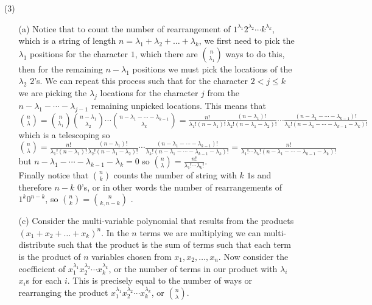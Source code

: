 \documentclass[12pt]{amsart}
\theoremstyle{definition}
\begin{document}
\begin{itemize}
\item[(3)]
\begin{itemize}
    \item[(a)] %
    Notice that to count the number of rearrangement of $1^{\lambda_{1}}2^{\lambda_{2}}\cdots k^{\lambda_{k}}$, which is a string of length $n=\lambda_1+\lambda_2+\dots+\lambda_k$, we first need to pick the $\lambda_1$ positions for the character $1$, which there are ${n\choose\lambda_1}$ ways to do this, then for the remaining $n-\lambda_1$ positions we must pick the locations of the $\lambda_2$ $2$'s. 
    We can repeat this process such that for the character $2<j\leq k$ we are picking the $\lambda_j$ locations for the character $j$ from the $n-\lambda_1-\cdots-\lambda_{j-1}$ remaining unpicked locations. 
    This means that ${n\choose\lambda}={n\choose\lambda_1}{n-\lambda_1\choose\lambda_2}\cdots{n-\lambda_1-\cdots-\lambda_{k-1}\choose\lambda_k}=\frac{n!}{\lambda_1!(n-\lambda_1)!}\frac{(n-\lambda_1)!}{\lambda_2!(n-\lambda_1-\lambda_2)!}\cdots\frac{(n-\lambda_1-\cdots-\lambda_{k-1})!}{\lambda_k!(n-\lambda_1-\cdots-\lambda_{k-1}-\lambda_k)!}$ which is a telescoping so ${n\choose\lambda}=\frac{n!}{\lambda_1!(n-\lambda_1)!}\frac{(n-\lambda_1)!}{\lambda_2!(n-\lambda_1-\lambda_2)!}\cdots\frac{(n-\lambda_1-\cdots-\lambda_{k-1})!}{\lambda_k!(n-\lambda_1-\cdots-\lambda_{k-1}-\lambda_k)!}=\frac{n!}{\lambda_1!\cdots\lambda_k!(n-\lambda_1-\cdots-\lambda_{k-1}-\lambda_k)!}$ but $n-\lambda_1-\cdots-\lambda_{k-1}-\lambda_k=0$ so ${n\choose\lambda}=\frac{n!}{\lambda_1!\cdots\lambda_k!}$.\\

    Finally notice that ${n\choose k}$ counts the number of string with $k$ $1$s and therefore $n-k$ $0$'s, or in other words the number of rearrangements of $1^k0^{n-k}$, so ${n\choose k}={n\choose k,n-k}$ .\\

    \item[(c)] %
    Consider the multi-variable polynomial that results from the products $(x_1+x_2+\dots+x_k)^n$. In the $n$ terms we are multiplying we can multi-distribute such that the product is the sum of terms such that each term is the product of $n$ variables chosen from $x_1,x_2,\dots,x_n$. Now consider the coefficient of $x_1^{\lambda_1}x_2^{\lambda_2}\cdots x_k^{\lambda_k}$, or the number of terms in our product with $\lambda_i$ $x_i$s for each $i$. This is precisely equal to the number of ways or rearranging the product $x_1^{\lambda_1}x_2^{\lambda_2}\cdots x_k^{\lambda_k}$, or ${n\choose \lambda}$.\\
    

\end{itemize}
\end{itemize}
\end{document}
